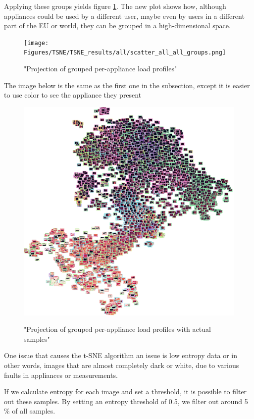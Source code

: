 Applying these groups yields figure \ref{fig:tsne_papb_scatter_all_groups}.
The new plot shows how, although appliances could be used by a different
user, maybe even by users in a different part of the EU or world,
they can be grouped in a high-dimensional space. 

\begin{figure}[H]
	\centering
	\caption{"Projection of grouped per-appliance load profiles"}
	\texttt{[image: Figures/TSNE/TSNE\_results/all/scatter\_all\_all\_groups.png]}
	\label{fig:tsne_papb_scatter_all_groups}
\end{figure}

The image below is the same as the first one in the subsection,
except it is easier to use color to see the appliance they present

\begin{figure}[H]
	\centering
	\caption{"Projection of grouped per-appliance load profiles with actual samples"}
	\includegraphics[width=.9\textwidth]{Figures/TSNE/TSNE_results/all/img_scatter_all_all_groups.png}
	\label{fig:tsne_papb_img_scatter_all_groups}
\end{figure}

One issue that causes the t-SNE algorithm an issue is low entropy data or 
in other words, images that are almost completely dark or white, due to various faults in appliances or measurements.

If we calculate entropy for each image and set a threshold, it is possible to filter out these samples. 
By setting an entropy threshold of 0.5, we filter out around 5 \% of all samples. 

